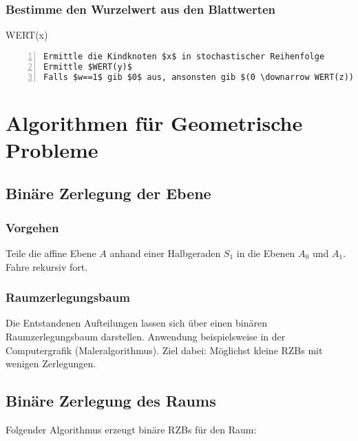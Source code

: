 \subsubsection{Bestimme den Wurzelwert aus den Blattwerten}
\begin{minipage}{\textwidth}
WERT(x)
\begin{lstlisting}[frame=single,numbers=left,mathescape]
Ermittle die Kindknoten $x$ in stochastischer Reihenfolge
Ermittle $WERT(y)$
Falls $w==1$ gib $0$ aus, ansonsten gib $(0 \downarrow WERT(z))$ aus
\end{lstlisting}
\end{minipage}



\section{Algorithmen für Geometrische Probleme}

\subsection{Binäre Zerlegung der Ebene}

\subsubsection{Vorgehen}
Teile die affine Ebene \(A\) anhand einer Halbgeraden \(S_1\) in die Ebenen \(A_0\) und \(A_1\). Fahre rekursiv fort.

\subsubsection{Raumzerlegungsbaum}
Die Entstandenen Aufteilungen lassen sich über einen binären Raumzerlegungsbaum darstellen. Anwendung beispielsweise in der Computergrafik (Maleralgorithmus).
Ziel dabei: Möglichst kleine RZBs mit wenigen Zerlegungen.


\subsection{Binäre Zerlegung des Raums}
Folgender Algorithmus erzeugt binäre RZBs für den Raum:

